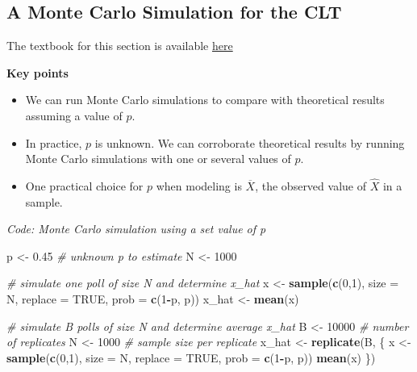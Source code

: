 \documentclass[
]{article}
\newenvironment{Shaded}{\begin{snugshade}}{\end{snugshade}}
\newcommand{\CommentTok}[1]{\textcolor[rgb]{0.56,0.35,0.01}{\textit{#1}}}
\newcommand{\DataTypeTok}[1]{\textcolor[rgb]{0.13,0.29,0.53}{#1}}
\newcommand{\DecValTok}[1]{\textcolor[rgb]{0.00,0.00,0.81}{#1}}
\newcommand{\FloatTok}[1]{\textcolor[rgb]{0.00,0.00,0.81}{#1}}
\newcommand{\KeywordTok}[1]{\textcolor[rgb]{0.13,0.29,0.53}{\textbf{#1}}}
\newcommand{\NormalTok}[1]{#1}
\newcommand{\OperatorTok}[1]{\textcolor[rgb]{0.81,0.36,0.00}{\textbf{#1}}}
\newcommand{\OtherTok}[1]{\textcolor[rgb]{0.56,0.35,0.01}{#1}}
\newcommand{\StringTok}[1]{\textcolor[rgb]{0.31,0.60,0.02}{#1}}
\providecommand{\tightlist}{%
  \setlength{\itemsep}{0pt}\setlength{\parskip}{0pt}}
\begin{document}
\hypertarget{a-monte-carlo-simulation-for-the-clt}{%
\subsection{A Monte Carlo Simulation for the
CLT}\label{a-monte-carlo-simulation-for-the-clt}}

The textbook for this section is available
\href{https://rafalab.github.io/dsbook/inference.html\#a-monte-carlo-simulation}{here}

\textbf{Key points}

\begin{itemize}
\tightlist
\item
  We can run Monte Carlo simulations to compare with theoretical results
  assuming a value of \(p\).
\item
  In practice, \(p\) is unknown. We can corroborate theoretical results
  by running Monte Carlo simulations with one or several values of
  \(p\).
\item
  One practical choice for \(p\) when modeling is \(\overline{X}\), the
  observed value of \(\hat{X}\) in a sample.
\end{itemize}

\emph{Code: Monte Carlo simulation using a set value of p}

\begin{Shaded}
\begin{Highlighting}[]
\NormalTok{p \textless{}{-}}\StringTok{ }\FloatTok{0.45}    \CommentTok{\# unknown p to estimate}
\NormalTok{N \textless{}{-}}\StringTok{ }\DecValTok{1000}

\CommentTok{\# simulate one poll of size N and determine x\_hat}
\NormalTok{x \textless{}{-}}\StringTok{ }\KeywordTok{sample}\NormalTok{(}\KeywordTok{c}\NormalTok{(}\DecValTok{0}\NormalTok{,}\DecValTok{1}\NormalTok{), }\DataTypeTok{size =}\NormalTok{ N, }\DataTypeTok{replace =} \OtherTok{TRUE}\NormalTok{, }\DataTypeTok{prob =} \KeywordTok{c}\NormalTok{(}\DecValTok{1}\OperatorTok{{-}}\NormalTok{p, p))}
\NormalTok{x\_hat \textless{}{-}}\StringTok{ }\KeywordTok{mean}\NormalTok{(x)}

\CommentTok{\# simulate B polls of size N and determine average x\_hat}
\NormalTok{B \textless{}{-}}\StringTok{ }\DecValTok{10000}    \CommentTok{\# number of replicates}
\NormalTok{N \textless{}{-}}\StringTok{ }\DecValTok{1000}    \CommentTok{\# sample size per replicate}
\NormalTok{x\_hat \textless{}{-}}\StringTok{ }\KeywordTok{replicate}\NormalTok{(B, \{}
\NormalTok{    x \textless{}{-}}\StringTok{ }\KeywordTok{sample}\NormalTok{(}\KeywordTok{c}\NormalTok{(}\DecValTok{0}\NormalTok{,}\DecValTok{1}\NormalTok{), }\DataTypeTok{size =}\NormalTok{ N, }\DataTypeTok{replace =} \OtherTok{TRUE}\NormalTok{, }\DataTypeTok{prob =} \KeywordTok{c}\NormalTok{(}\DecValTok{1}\OperatorTok{{-}}\NormalTok{p, p))}
    \KeywordTok{mean}\NormalTok{(x)}
\NormalTok{\})}
\end{Highlighting}
\end{Shaded}
\end{document}
